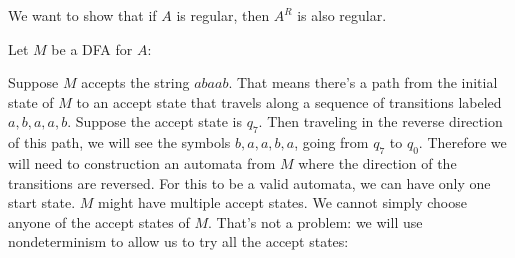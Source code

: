
We want to show that if $A$ is regular, then $A^R$ is also regular.

Let $M$ be a DFA for $A$:

\begin{center}
\end{center}
Suppose $M$ accepts the string $abaab$.
That means there's a path from the initial state of $M$ to an accept state that travels along a sequence of transitions
labeled $a, b, a, a, b$.
Suppose the accept state is $q_7$.
Then traveling in the reverse direction of this path, we will see the symbols $b,a,a,b,a$, going from $q_7$ to $q_0$.
Therefore we will need to construction an automata from $M$ where the direction of the transitions are reversed.
For this to be a valid automata, we can have only one start state.
$M$ might have multiple accept states.
We cannot simply choose anyone of the accept states of $M$.
That's not a problem: we will use nondeterminism to allow us to try all the accept states:

